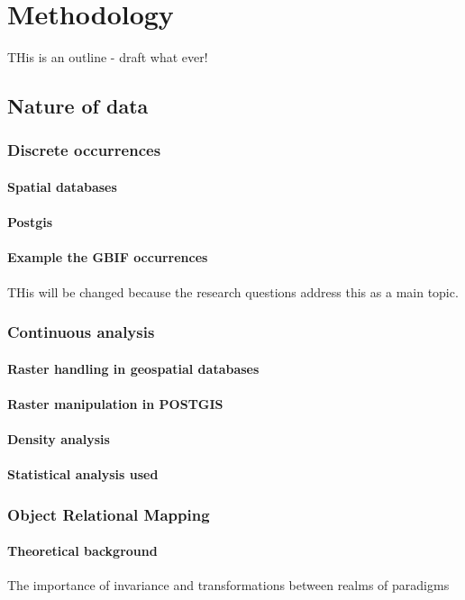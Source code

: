\chapter{Methodology}
THis is an outline - draft what ever!

\section{Nature of data}
\subsection{Discrete occurrences}
\subsubsection{Spatial databases}
\subsubsection{Postgis}
\subsubsection{Example the GBIF occurrences}
THis will be changed because the research questions address this as a main topic.

\subsection{Continuous analysis}
\subsubsection{Raster handling in geospatial databases}
\subsubsection{Raster manipulation in POSTGIS}
\subsubsection{Density analysis}
\subsubsection{Statistical analysis used}


\subsection{Object Relational Mapping}
\subsubsection{Theoretical background}
The importance of invariance and transformations between realms of paradigms
